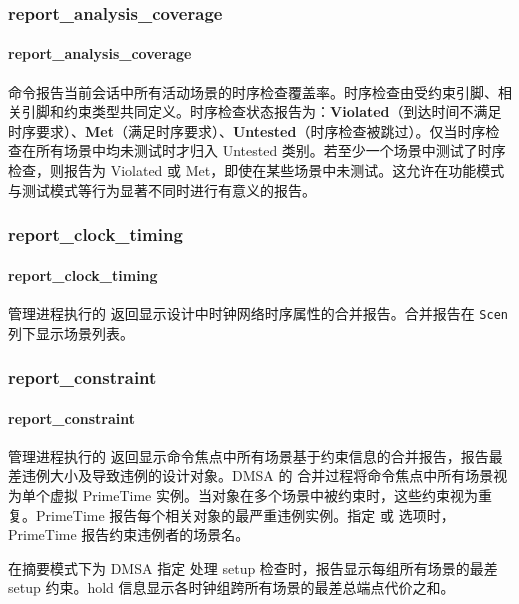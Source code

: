 \subsubsection{report\_analysis\_coverage}
\paragraph*{report\_analysis\_coverage}

 命令报告当前会话中所有活动场景的时序检查覆盖率。时序检查由受约束引脚、相关引脚和约束类型共同定义。时序检查状态报告为：\textbf{Violated}（到达时间不满足时序要求）、\textbf{Met}（满足时序要求）、\textbf{Untested}（时序检查被跳过）。仅当时序检查在所有场景中均未测试时才归入 Untested 类别。若至少一个场景中测试了时序检查，则报告为 Violated 或 Met，即使在某些场景中未测试。这允许在功能模式与测试模式等行为显著不同时进行有意义的报告。

\subsubsection{report\_clock\_timing}
\paragraph*{report\_clock\_timing}

管理进程执行的  返回显示设计中时钟网络时序属性的合并报告。合并报告在 \texttt{Scen} 列下显示场景列表。

\subsubsection{report\_constraint}
\paragraph*{report\_constraint}

管理进程执行的  返回显示命令焦点中所有场景基于约束信息的合并报告，报告最差违例大小及导致违例的设计对象。DMSA 的  合并过程将命令焦点中所有场景视为单个虚拟 PrimeTime 实例。当对象在多个场景中被约束时，这些约束视为重复。PrimeTime 报告每个相关对象的最严重违例实例。指定  或  选项时，PrimeTime 报告约束违例者的场景名。

在摘要模式下为 DMSA 指定  处理 setup 检查时，报告显示每组所有场景的最差 setup 约束。hold 信息显示各时钟组跨所有场景的最差总端点代价之和。

